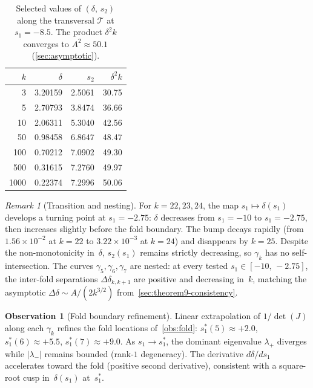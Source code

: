 \documentclass[11pt,a4paper]{article}
\theoremstyle{plain}
\theoremstyle{definition}
\newtheorem{observation}[theorem]{Observation}
\theoremstyle{remark}
\newtheorem{remark}[theorem]{Remark}
\newcommand{\abs}[1]{\lvert #1 \rvert}
\begin{document}
\begin{table}[ht]
\centering
\caption{Selected values of $(\delta,\, s_2)$ along the
  transversal $\mathcal{T}$ at $s_1 = -8.5$.  The product
  $\delta^2 k$ converges to $A^2 \approx 50.1$
  (\cref{sec:asymptotic}).}
\label{tab:transversal}
\smallskip
\begin{tabular}{@{}r@{\quad}r@{\quad}r@{\quad}r@{}}
\toprule
$k$ & $\delta$ & $s_2$ & $\delta^2 k$ \\
\midrule
3    & 3.20159 & 2.5061 & 30.75 \\
5    & 2.70793 & 3.8474 & 36.66 \\
10   & 2.06311 & 5.3040 & 42.56 \\
50   & 0.98458 & 6.8647 & 48.47 \\
100  & 0.70212 & 7.0902 & 49.30 \\
500  & 0.31615 & 7.2760 & 49.97 \\
1000 & 0.22374 & 7.2996 & 50.06 \\
\bottomrule
\end{tabular}
\end{table}

\begin{remark}[Transition and nesting]
\label{obs:transition}
For $k = 22, 23, 24$, the map $s_1 \mapsto \delta(s_1)$
develops a turning point at $s_1 = -2.75$: $\delta$ decreases
from $s_1 = -10$ to $s_1 = -2.75$, then increases slightly
before the fold boundary.  The bump decays rapidly
(from $1.56 \times 10^{-2}$ at $k=22$ to
$3.22 \times 10^{-3}$ at $k=24$) and disappears by $k = 25$.
Despite the non-monotonicity in~$\delta$, $s_2(s_1)$ remains
strictly decreasing, so $\gamma_k$ has no self-intersection.
The curves $\gamma_5, \gamma_6, \gamma_7$ are nested:
at every tested $s_1 \in [-10,\, -2.75]$, the inter-fold
separations $\Delta\delta_{k,k+1}$ are positive and
decreasing in~$k$, matching the asymptotic
$\Delta\delta \sim A/(2k^{3/2})$
from~\cref{sec:theorem9-consistency}.
\end{remark}

\begin{observation}[Fold boundary refinement]
\label{obs:fold-refined}
Linear extrapolation of $1/\det(J)$ along each
$\gamma_k$ refines the fold locations
of~\cref{obs:fold}:
$s_1^*(5) \approx +2.0$,
$s_1^*(6) \approx +5.5$,
$s_1^*(7) \approx +9.0$.
As $s_1 \to s_1^*$, the dominant eigenvalue
$\lambda_+$ diverges while $\abs{\lambda_-}$ remains
bounded (rank\nobreakdash-$1$ degeneracy).
The derivative $d\delta/ds_1$ accelerates toward the fold
(positive second derivative), consistent with a
square-root cusp in~$\delta(s_1)$ at~$s_1^*$.
\end{observation}
\end{document}
